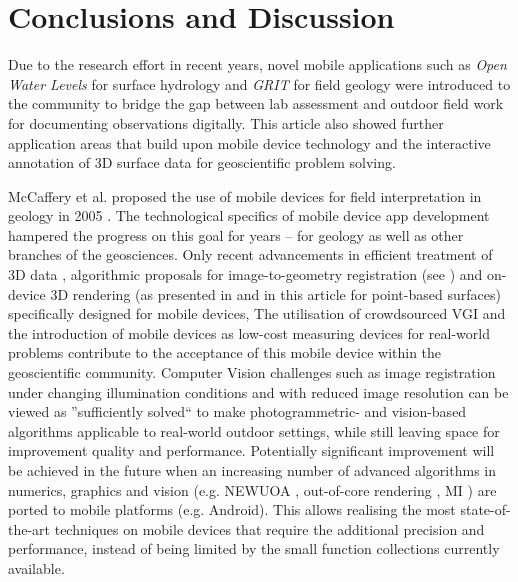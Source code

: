 \documentclass[review]{elsarticle}
\begin{document}
\section{Conclusions and Discussion}
\label{sec:conclusions}

 Due to the research effort in recent years, novel mobile applications such as \textit{Open Water Levels} for surface hydrology and \textit{\gls{GRIT}} for field geology were introduced to the community to bridge the gap between lab assessment and outdoor field work for documenting observations digitally. This article also showed further application areas that build upon mobile device technology and the interactive annotation of 3D surface data for geoscientific problem solving.

McCaffery et al. proposed the use of mobile devices for field interpretation in geology in 2005 \cite{McCaffrey2005}. The technological specifics of mobile device app development hampered the progress on this goal for years -- for geology as well as other branches of the geosciences. Only recent advancements in efficient treatment of 3D data \cite{Kroehnert2017b}, algorithmic proposals for image-to-geometry registration (see \citep{Gauglitz2014,Kehl2017_VGC}) and on-device 3D rendering (as presented in \cite{Agus2017} and in this article for point-based surfaces) specifically designed for mobile devices,  The utilisation of crowdsourced \gls{VGI} and the introduction of mobile devices as low-cost measuring devices for real-world problems \cite{Eltner2017} contribute to the acceptance of this mobile device  within the geoscientific community. Computer Vision challenges such as image registration under changing illumination conditions and with reduced image resolution can be viewed as ''sufficiently solved`` to make photogrammetric- and vision-based algorithms applicable to real-world outdoor settings, while still leaving space for improvement  quality and performance. Potentially significant improvement will be achieved in the future when an increasing number of advanced algorithms in numerics, graphics and vision (e.g. NEWUOA \cite{Powell2006}, out-of-core rendering \cite{Borgeat2005}, \gls{MI} \cite{Viola1997}) are ported to mobile platforms (e.g. Android). This allows realising the most state-of-the-art techniques on mobile devices that require the additional precision and performance, instead of being limited by the small function collections currently available.
\end{document}
